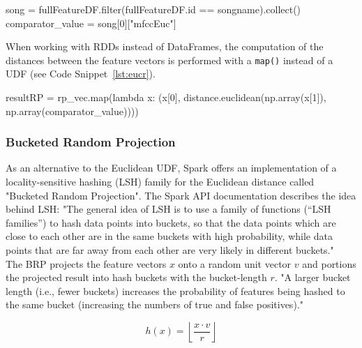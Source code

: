 \begin{pythonCode}[frame=single,label={lst:comp},caption={Filter for requested song},captionpos=b]
song = fullFeatureDF.filter(fullFeatureDF.id == songname).collect()
comparator_value = song[0]["mfccEuc"]
\end{pythonCode}

\noindent When working with RDDs instead of DataFrames, the computation of the distances between the feature vectors is performed with a \lstinline{map()} instead of a UDF (see Code Snippet~\ref{lst:eucr}). 

\begin{pythonCode}[frame=single,label={lst:eucr},caption={Euclidean distance RDD},captionpos=b]
resultRP = rp_vec.map(lambda x: (x[0], distance.euclidean(np.array(x[1]), np.array(comparator_value))))
\end{pythonCode}

\subsubsection{Bucketed Random Projection}

As an alternative to the Euclidean UDF, Spark offers an implementation of a locality-sensitive hashing (LSH) family for the Euclidean distance called "Bucketed Random Projection". The Spark API documentation describes the idea behind LSH: "The general idea of LSH is to use a family of functions (“LSH families”) to hash data points into buckets, so that the data points which are close to each other are in the same buckets with high probability, while data points that are far away from each other are very likely in different buckets."~\cite{lshspark} The BRP projects the feature vectors $x$ onto a random unit vector $v$ and portions the projected result into hash buckets with the bucket-length $r$. "A larger bucket length (i.e., fewer buckets) increases the probability of features being hashed to the same bucket (increasing the numbers of true and false positives)."~\cite{lshspark}

\begin{equation} \label{eq:brp}
h(x) = \left \lfloor{\frac{x \cdot v}{r}}\right \rfloor 
\end{equation}

